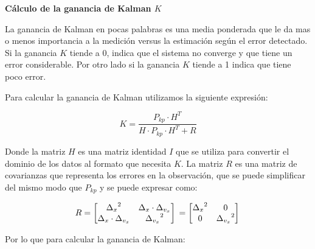 \textbf{Cálculo de la ganancia de Kalman $K$} \mbox{} \vspace{8pt}

La ganancia de Kalman en pocas palabras es una media ponderada que le da mas o menos importancia a la medición versus la estimación según el error detectado. Si la ganancia $K$ tiende a 0, indica que el sistema no converge y que tiene un error considerable. Por otro lado si la ganancia $K$ tiende a 1 indica que tiene poco error.

Para calcular la ganancia de Kalman utilizamos la siguiente expresión:

$$ K = \frac{P_{kp} \cdot H^T}
            {H \cdot P_{kp} \cdot H^T + R}
$$

Donde la matriz $H$ es una matriz identidad $I$ que se utiliza para convertir el dominio de los datos al formato que necesita $K$. La matriz $R$ es una matriz de covarianzas que representa los errores en la observación, que se puede simplificar del mismo modo que $P_{kp}$ y se puede expresar como:

 $$ R =
    \begin{bmatrix}
    {\Delta_x}^2 & \Delta_x \cdot \Delta_{v_x} \\
    \Delta_x \cdot \Delta_{v_x} & {\Delta_{v_x}}^2 \\
    \end{bmatrix} \\ 
    =
    \begin{bmatrix}
    {\Delta_x}^2 & 0 \\
    0 & {\Delta_{v_x}}^2 \\
    \end{bmatrix} \\ 
$$

Por lo que para calcular la ganancia de Kalman:

